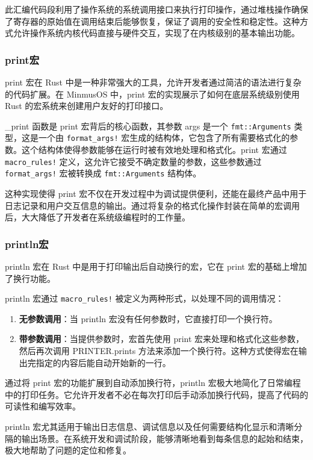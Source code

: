 此汇编代码段利用了操作系统的系统调用接口来执行打印操作，通过堆栈操作确保了寄存器的原始值在调用结束后能够恢复，保证了调用的安全性和稳定性。这种方式允许操作系统内核代码直接与硬件交互，实现了在内核级别的基本输出功能。

\subsubsection{print宏}

print 宏在 Rust 中是一种非常强大的工具，允许开发者通过简洁的语法进行复杂的代码扩展。在 MinmusOS 中，print 宏的实现展示了如何在底层系统级别使用 Rust 的宏系统来创建用户友好的打印接口。

\_print 函数是 print 宏背后的核心函数，其参数 args 是一个 \texttt{fmt::Arguments} 类型，这是一个由 \texttt{format\_args!} 宏生成的结构体，它包含了所有需要格式化的参数。这个结构体使得参数能够在运行时被有效地处理和格式化。print 宏通过 \texttt{macro\_rules!} 定义，这允许它接受不确定数量的参数，这些参数通过 \texttt{format\_args!} 宏被转换成 \texttt{fmt::Arguments} 结构体。

这种实现使得 print 宏不仅在开发过程中为调试提供便利，还能在最终产品中用于日志记录和用户交互信息的输出。通过将复杂的格式化操作封装在简单的宏调用后，大大降低了开发者在系统级编程时的工作量。

\subsubsection{println宏}

println 宏在 Rust 中是用于打印输出后自动换行的宏，它在 print 宏的基础上增加了换行功能。

println 宏通过 \texttt{macro\_rules!} 被定义为两种形式，以处理不同的调用情况：

\begin{enumerate}
    \item \textbf{无参数调用}：当 println 宏没有任何参数时，它直接打印一个换行符。
    \item \textbf{带参数调用}：当提供参数时，宏首先使用 print 宏来处理和格式化这些参数，然后再次调用 PRINTER.prints 方法来添加一个换行符。这种方式使得宏在输出完指定的内容后能自动开始新的一行。
\end{enumerate}

通过将 print 宏的功能扩展到自动添加换行符，println 宏极大地简化了日常编程中的打印任务。它允许开发者不必在每次打印后手动添加换行代码，提高了代码的可读性和编写效率。

println 宏尤其适用于输出日志信息、调试信息以及任何需要结构化显示和清晰分隔的输出场景。在系统开发和调试阶段，能够清晰地看到每条信息的起始和结束，极大地帮助了问题的定位和修复。

